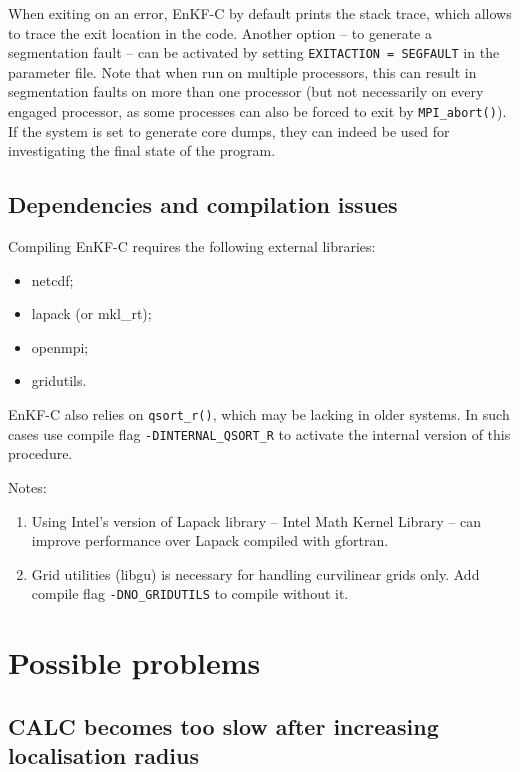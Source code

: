 \documentclass[11pt]{report}
\begin{document}
When exiting on an error, EnKF-C by default prints the stack trace, which allows to trace the exit location in the code.
Another option -- to generate a segmentation fault -- can be activated by setting \verb|EXITACTION = SEGFAULT| in the parameter file.
Note that when run on multiple processors, this can result in segmentation faults on more than one processor (but not necessarily on every engaged processor, as some processes can also be forced to exit by \verb|MPI_abort()|).
If the system is set to generate core dumps, they can indeed be used for investigating the final state of the program.

\subsection{Dependencies and compilation issues}

Compiling EnKF-C requires the following external libraries:
\begin{itemize}
\item netcdf;
\item lapack (or mkl\_rt);
\item openmpi;
\item gridutils.
\end{itemize}

EnKF-C also relies on \verb|qsort_r()|, which may be lacking in older systems.
In such cases use compile flag \verb|-DINTERNAL_QSORT_R| to activate the internal version of this procedure.

Notes:
\vspace{-3mm}
\begin{enumerate}
\item Using Intel's version of Lapack library -- Intel Math Kernel Library -- can improve performance over Lapack compiled with gfortran.
\item Grid  utilities (libgu) is necessary for handling curvilinear grids only.
Add compile flag \verb|-DNO_GRIDUTILS| to compile without it.
\end{enumerate}

\section{Possible problems}

\subsection{CALC becomes too slow after increasing localisation radius}
\end{document}
